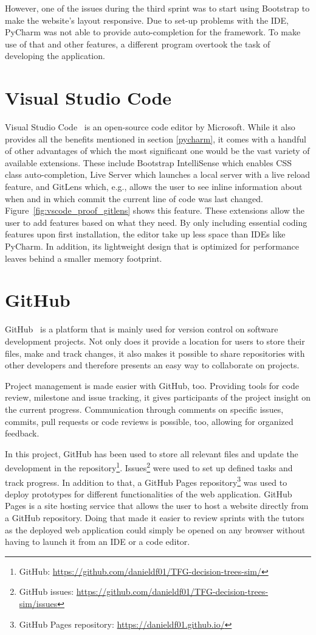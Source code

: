 However, one of the issues during the third sprint was to start using Bootstrap to make the website's layout responsive. Due to set-up problems with the IDE, PyCharm was not able to provide auto-completion for the framework. To make use of that and other features, a different program overtook the task of developing the application.

\section{Visual Studio Code}
Visual Studio Code~\cite{vscode} is an open-source code editor by Microsoft. While it also provides all the benefits mentioned in section \ref{pycharm}, it comes with a handful of other advantages of which the most significant one would be the vast variety of available extensions.
These include Bootstrap IntelliSense which enables CSS class auto-completion, Live Server which launches a local server with a live reload feature, and GitLens which, e.g., allows the user to see inline information about when and in which commit the current line of code was last changed. Figure~\ref{fig:vscode_proof_gitlens} shows this feature.
These extensions allow the user to add features based on what they need. By only including essential coding features upon first installation, the editor take up less space than IDEs like PyCharm.
In addition, its lightweight design that is optimized for performance leaves behind a smaller memory footprint.

\section{GitHub}
GitHub~\cite{github} is a platform that is mainly used for version control on software development projects. Not only does it provide a location for users to store their files, make and track changes, it also makes it possible to share repositories with other developers and therefore presents an easy way to collaborate on projects.

Project management is made easier with GitHub, too. Providing tools for code review, milestone and issue tracking, it gives participants of the project insight on the current progress. Communication through comments on specific issues, commits, pull requests or code reviews is possible, too, allowing for organized feedback.

In this project, GitHub has been used to store all relevant files and update the development in 
the repository\footnote{GitHub: \url{https://github.com/danieldf01/TFG-decision-trees-sim/}}. Issues\footnote{GitHub issues: \url{https://github.com/danieldf01/TFG-decision-trees-sim/issues}} were used to set up defined tasks and track progress. In addition to that, a GitHub Pages repository\footnote{GitHub Pages repository: \url{https://danieldf01.github.io/}} was used to deploy prototypes for different functionalities of the web application. GitHub Pages is a site hosting service that allows the user to host a website directly from a GitHub repository. Doing that made it easier to review sprints with the tutors as the deployed web application could simply be opened on any browser without having to launch it from an IDE or a code editor.


